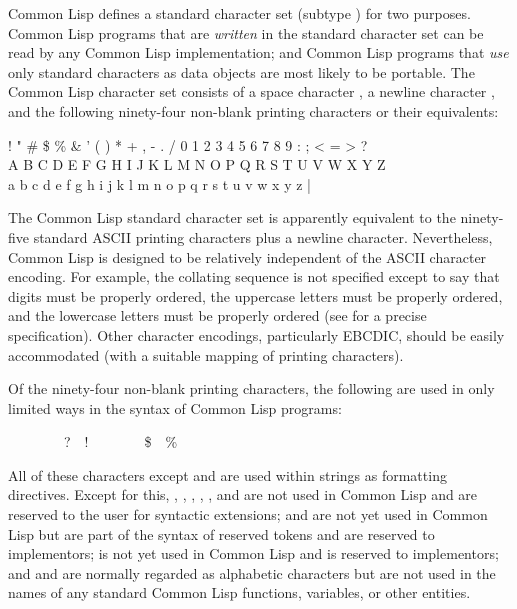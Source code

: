 Common Lisp defines a standard character set (subtype )
for two purposes.
Common Lisp programs that are {\it written} in the standard character set
can be read by any Common Lisp implementation; and Common Lisp programs
that {\it use} only standard characters as data objects are most likely
to be portable.  The Common Lisp character set consists of a space character
, a newline character , and the
following ninety-four
non-blank printing characters or their equivalents:
\begin{lisp}
! " \# \$ \% \& ' ( ) * + , - . / 0 1 2 3 4 5 6 7 8 9 : ; < = > ? \\
{\Xatsign} A B C D E F G H I J K L M N O P Q R S T U V W X Y Z {\Xlbracket} {\Xbackslash} {\Xrbracket} {\Xcircumflex} {\Xunderscore} \\
{\Xbq} a b c d e f g h i j k l m n o p q r s t u v w x y z {\Xlbrace} | {\Xrbrace} {\Xtilde}
\end{lisp}
The Common Lisp standard character set is apparently equivalent to
the ninety-five standard ASCII printing characters plus a newline character.
Nevertheless, Common Lisp is designed to be relatively independent of
the ASCII character encoding.  For example, the collating sequence
is not specified except to say that digits must be properly ordered,
the uppercase letters must be properly ordered, and
the lowercase letters must be properly ordered
(see  for a precise specification).
Other character encodings, particularly EBCDIC, should be easily accommodated
(with a suitable mapping of printing characters).

Of the ninety-four non-blank printing characters, the following are
used in only limited ways in the syntax of Common Lisp programs:
\begin{lisp}
{\Xlbracket}~~{\Xrbracket}~~{\Xlbrace}~~{\Xrbrace}~~?~~!~~{\Xcircumflex}~~{\Xunderscore}~~{\Xtilde}~~\$~~\% 
\end{lisp}
\begin{obsolete}
\noindent
All of these characters except \cd{!} and \cd{{\Xunderscore}} are used within
 strings as formatting directives.
Except for this,
\cd{{\Xlbracket}}, \cd{{\Xrbracket}}, \cd{{\Xlbrace}}, \cd{{\Xrbrace}},
, and \cd{!} are not used in Common Lisp and are reserved to the user
for syntactic extensions; \cd{{\Xcircumflex}} and \cd{{\Xunderscore}}
are not yet used in Common Lisp
but are part of the syntax of reserved tokens
and are reserved to implementors;
\cd{{\Xtilde}} is not yet used in Common Lisp and is reserved to implementors;
and \cd{\$} and \cd{\%} are normally regarded as alphabetic characters
but are not used in the names of any standard Common Lisp functions,
variables, or other entities.
\end{obsolete}

